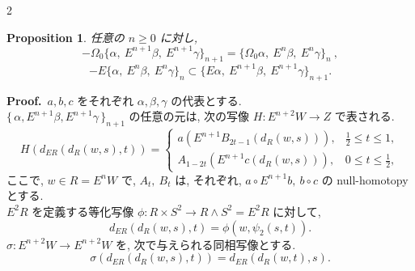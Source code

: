 \documentclass[10pt, leqno]{ltjsarticle}
\newcommand{\Ex}{E}        %
\newcommand{\todai}[2][]{\{\,#2\,\}_{#1}}      %
\numberwithin{equation}{section}
\theoremstyle{plain}
\newtheorem{proposition}[theorem]{Proposition}
\theoremstyle{definition}
\theoremstyle{remark}
\begin{document}
\begin{paracol}{2}

\begin{proposition}\label{prop:1-3}
任意の $n\ge 0$ に対し,
\[
-\Omega_0\bigl\{\alpha,\ \Ex^{n+1}\beta,\ \Ex^{n+1}\gamma\bigr\}_{n+1}
=
\bigl\{\Omega_0\alpha,\ \Ex^{n}\beta,\ \Ex^{n}\gamma\bigr\}_n \ ,
\]
\[
-\Ex\{\alpha,\ \Ex^n\beta,\ \Ex^n\gamma\}_n
\subset
\bigl\{E\alpha,\ \Ex^{n+1}\beta,\ \Ex^{n+1}\gamma\bigr\}_{n+1}.
\]
\end{proposition}

\noindent
\textbf{Proof.}\
$a,b,c$ をそれぞれ $\alpha,\beta,\gamma$ の代表とする.\\
\(\todai[n+1]{\alpha, E^{n+1}\beta, E^{n+1}\gamma}\) 
の任意の元は, 次の写像 \(H:E^{n+2}W\to Z\)
で表される.
\[
H(d_{ER}(d_R(w,s),t))=
\begin{cases}
a(\Ex^{n+1}B_{2t-1}(d_R(w,s))), 
& \tfrac12\le t\le 1,\\[2mm]
A_{1-2t}(\Ex^{n+1}c(d_R(w,s))), 
& 0\le t\le \tfrac12,
\end{cases}
\]
ここで,
\(w\in R = E^n W\)
で,
\(A_t,\ B_t\) 
は, それぞれ,
\(a\circ E^{n+1}b,\ b\circ c\)
の null-homotopy とする.\\
\(E^2 R\) を定義する等化写像
\(\phi:R\times S^2\to R\wedge S^2 = E^2 R\)
に対して,
\[
d_{ER}(d_R(w,s),t) = \phi(w, \psi_2(s, t)).
\]
\(\sigma:E^{n+2}W\to E^{n+2}W\)
を, 次で与えられる同相写像とする.
\[
\sigma(d_{ER}(d_R(w,s),t))
= d_{ER}(d_R(w,t), s).
\]

\switchcolumn

\end{paracol}
\end{document}
